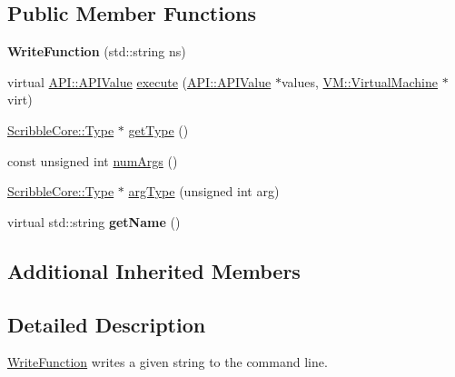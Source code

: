 \subsection*{Public Member Functions}
\begin{DoxyCompactItemize}
\item 
\hypertarget{class_write_function_ad6e416a0d8e38b55a02ac2ace7941dfb}{{\bfseries Write\-Function} (std\-::string ns)}\label{class_write_function_ad6e416a0d8e38b55a02ac2ace7941dfb}

\item 
virtual \hyperlink{class_a_p_i_1_1_a_p_i_value}{A\-P\-I\-::\-A\-P\-I\-Value} \hyperlink{class_write_function_a595652aa0e6f2f2dab95b251f4fed934}{execute} (\hyperlink{class_a_p_i_1_1_a_p_i_value}{A\-P\-I\-::\-A\-P\-I\-Value} $\ast$values, \hyperlink{class_v_m_1_1_virtual_machine}{V\-M\-::\-Virtual\-Machine} $\ast$virt)
\item 
\hyperlink{class_scribble_core_1_1_type}{Scribble\-Core\-::\-Type} $\ast$ \hyperlink{class_write_function_af13b3f0f1a575a4836e7a0743dfc0016}{get\-Type} ()
\item 
const unsigned int \hyperlink{class_write_function_a19c26d1f8efd08ae7ef0051ca32fc1e9}{num\-Args} ()
\item 
\hyperlink{class_scribble_core_1_1_type}{Scribble\-Core\-::\-Type} $\ast$ \hyperlink{class_write_function_a223f1c9a6f2d88ca561409fa21af3d86}{arg\-Type} (unsigned int arg)
\item 
\hypertarget{class_write_function_ab3a0ff179dc7ca7e92577e1a0ba010bf}{virtual std\-::string {\bfseries get\-Name} ()}\label{class_write_function_ab3a0ff179dc7ca7e92577e1a0ba010bf}

\end{DoxyCompactItemize}
\subsection*{Additional Inherited Members}


\subsection{Detailed Description}
\hyperlink{class_write_function}{Write\-Function} writes a given string to the command line. 

